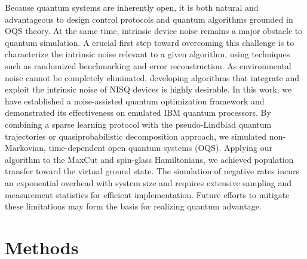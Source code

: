 \documentclass[10pt, superscriptaddress,aps,pra,twocolumn,showpacs,nofootinbib, longbibliography, notitlepage,floatfix]{revtex4-2}
\begin{document}
Because quantum systems are inherently open, it is both natural and advantageous to design control protocols and quantum algorithms grounded in OQS theory. At the same time, intrinsic device noise remains a major obstacle to quantum simulation. A crucial first step toward overcoming this challenge is to characterize the intrinsic noise relevant to a given algorithm, using techniques such as randomized benchmarking and error reconstruction. As environmental noise cannot be completely eliminated, developing algorithms that integrate and exploit the intrinsic noise of NISQ devices is highly desirable. In this work, we have established a noise-assisted quantum optimization framework and demonstrated its effectiveness on emulated IBM quantum processors. By combining a sparse learning protocol with the pseudo-Lindblad quantum trajectories or quasiprobabilistic decomposition approach, we simulated non-Markovian, time-dependent open quantum systems (OQS). Applying our algorithm to the MaxCut and spin-glass Hamiltonians, we achieved population transfer toward the virtual ground state. The simulation of negative rates incurs an exponential overhead with system size and requires extensive sampling and measurement statistics for efficient implementation. Future efforts to mitigate these limitations may form the basis for realizing quantum advantage.
  

\section*{Methods}
\end{document}
